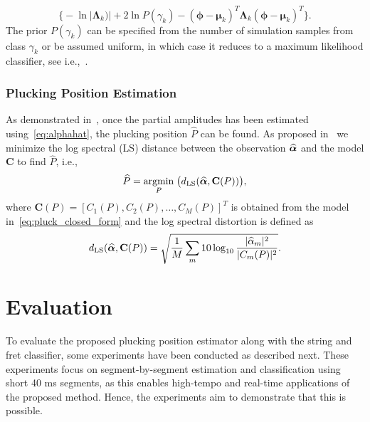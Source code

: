\documentclass{article}
\begin{document}
\begin{sloppy}
\begin{equation}
\bigg\{ -\ln \lvert \boldsymbol{\Lambda}_k) \rvert + 2 \ln P(\gamma_k) - (\boldsymbol{\phi}-\boldsymbol{\mu}_k)^T \boldsymbol{\Lambda}_k (\boldsymbol{\phi}-\boldsymbol{\mu}_k)^T    %
\bigg\}.
\end{equation}
%
The prior $P(\gamma_k)$ can be specified from the number of simulation samples from class $\gamma_k$ or be assumed uniform, in which case it reduces to a maximum likelihood classifier, see i.e.,~\cite{mspr}.
%
\vspace{-.8mm}
\subsubsection{Plucking Position Estimation} %
\label{sec:proposed_estimation_of_pluck_amplitude}
\vspace{-.6mm}
As demonstrated in~\cite{hjerrild::icassp19}, once the partial amplitudes has been estimated using~\eqref{eq:alphahat}, the plucking position $\widehat{P}$ can be found. As proposed in~\cite{hjerrild::icassp19} we minimize the log spectral (LS) distance between the observation $\text{\boldmath${\widehat\alpha}$}$ and the model $\mathbf{C}$ to find $\widehat{P}$, i.e., 
\begin{equation}
    \widehat{P} = \underset{P}{\operatorname{argmin}}\;{\big(d_{\textup{LS}}(\text{\boldmath${\widehat\alpha}$},\mathbf{C}(P))\big)},
\end{equation}
where $\mathbf{C}(P) = [C_1(P),C_2(P),\dots,C_M(P)]^T$ is obtained from the model in~\eqref{eq:pluck_closed_form} and the log spectral distortion is defined as
\begin{equation}
    d_{\textup{LS}}(\text{\boldmath${\widehat\alpha}$},\mathbf{C}(P)) = \sqrt{ \frac{1}{M} \sum_m 10\log_{10} \frac{\lvert\widehat{\alpha}_m\rvert^2}{\lvert C_m(P)\rvert^2} }.
\end{equation} 
%
\section{Evaluation} %
\label{sec:experiments}
To evaluate the proposed plucking position estimator along with the string and fret classifier, some experiments have been conducted as described next. These experiments focus on segment-by-segment estimation and classification using short 40 ms segments, as this enables high-tempo and real-time applications of the proposed method. Hence, the experiments aim to demonstrate that this is possible.
%
%
%
%
%


\end{sloppy}
\end{document}
